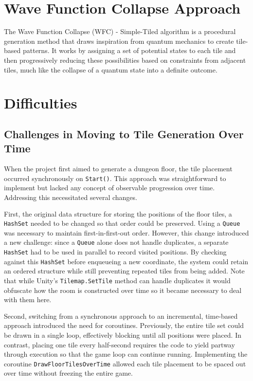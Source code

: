 \documentclass[a4paper, 12pt, one column, aas_macros]{article}
\begin{document}
\section{Wave Function Collapse Approach}
The Wave Function Collapse (WFC) - Simple-Tiled algorithm is a procedural generation method that draws inspiration from quantum mechanics to create tile-based patterns. It works by assigning a set of potential states to each tile and then progressively reducing these possibilities based on constraints from adjacent tiles, much like the collapse of a quantum state into a definite outcome.

\section{Difficulties}
\subsection{Challenges in Moving to Tile Generation Over Time}
When the project first aimed to generate a dungeon floor, the tile placement occurred synchronously on \texttt{Start()}. This approach was straightforward to implement but lacked any concept of observable progression over time. Addressing this necessitated several changes. 

First, the original data structure for storing the positions of the floor tiles, a \texttt{HashSet} needed to be changed so that order could be preserved. Using a \texttt{Queue} was necessary to maintain first-in-first-out order. However, this change introduced a new challenge: since a \texttt{Queue} alone does not handle duplicates, a separate \texttt{HashSet} had to be used in parallel to record visited positions. By checking against this \texttt{HashSet} before enqueueing a new coordinate, the system could retain an ordered structure while still preventing repeated tiles from being added. Note that while Unity's \texttt{Tilemap.SetTile} method can handle duplicates it would obfuscate how the room is constructed over time so it became necessary to deal with them here. 

Second, switching from a synchronous approach to an incremental, time-based approach introduced the need for coroutines. Previously, the entire tile set could be drawn in a single loop, effectively blocking until all positions were placed. In contrast, placing one tile every half-second requires the code to yield partway through execution so that the game loop can continue running. Implementing the coroutine \texttt{DrawFloorTilesOverTime} allowed each tile placement to be spaced out over time without freezing the entire game.
\end{document}
